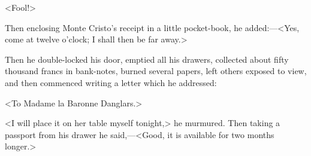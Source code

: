  <Fool!> 

 Then enclosing Monte Cristo's receipt in a little pocket-book, he added:—<Yes, come at twelve o'clock; I shall then be far away.> 

 Then he double-locked his door, emptied all his drawers, collected about fifty thousand francs in bank-notes, burned several papers, left others exposed to view, and then commenced writing a letter which he addressed: 

 <To Madame la Baronne Danglars.> 

 <I will place it on her table myself tonight,> he murmured. Then taking a passport from his drawer he said,—<Good, it is available for two months longer.> 
